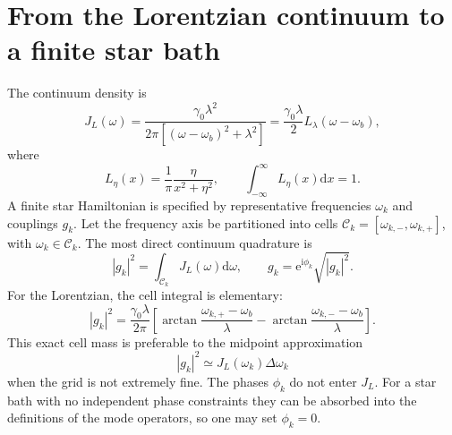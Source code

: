 \documentclass[reprint,superscriptaddress,floatfix,amsmath,amssymb,prresearch,aps]{revtex4-2}
\newcommand{\dd}{\mathrm{d}}
\newcommand{\ee}{\mathrm{e}}
\newcommand{\ii}{\mathrm{i}}
\begin{document}
\section{From the Lorentzian continuum to a finite star bath}
\label{app:discretization}

The continuum density is
\begin{equation}
J_L(\omega)=\frac{\gamma_0\lambda^2}
{2\pi[(\omega-\omega_b)^2+\lambda^2]}
=\frac{\gamma_0\lambda}{2}L_\lambda(\omega-\omega_b),
\label{eq:s_J}
\end{equation}
where
\begin{equation}
L_\eta(x)=\frac{1}{\pi}\frac{\eta}{x^2+\eta^2},
\qquad \int_{-\infty}^{\infty}L_\eta(x)\dd x=1.
\label{eq:s_L}
\end{equation}
A finite star Hamiltonian is specified by representative frequencies
\(\omega_k\) and couplings \(g_k\). Let the frequency axis be partitioned
into cells \(\mathcal C_k=[\omega_{k,-},\omega_{k,+}]\), with
\(\omega_k\in\mathcal C_k\). The most direct continuum quadrature is
\begin{equation}
|g_k|^2=\int_{\mathcal C_k}J_L(\omega)\dd\omega,
\qquad g_k=\ee^{\ii\phi_k}\sqrt{|g_k|^2}.
\label{eq:s_cell_general}
\end{equation}
For the Lorentzian, the cell integral is elementary:
\begin{equation}
|g_k|^2=\frac{\gamma_0\lambda}{2\pi}
\left[
\arctan\!\frac{\omega_{k,+}-\omega_b}{\lambda}
-\arctan\!\frac{\omega_{k,-}-\omega_b}{\lambda}
\right].
\label{eq:s_cell_exact}
\end{equation}
This exact cell mass is preferable to the midpoint approximation
\begin{equation}
|g_k|^2\simeq J_L(\omega_k)\Delta\omega_k
\label{eq:s_midpoint}
\end{equation}
when the grid is not extremely fine. The phases \(\phi_k\) do not enter
\(J_L\). For a star bath with no independent phase constraints they can be
absorbed into the definitions of the mode operators, so one may set
\(\phi_k=0\).
\end{document}
